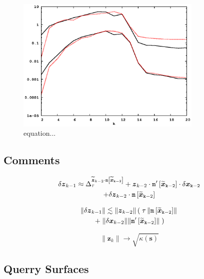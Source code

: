 \documentclass[letterpaper,twocolumn,amsmath,amsfont,amssymb,english,aps,jcp,preprintnumbers,groupaddress,nofootinbib,tightenlines]{revtex4}
\newcommand{\mat}[1]{\boldsymbol{#1}}
\begin{document}
\begin{figure}[h]
  \caption{equation...}
 \includegraphics[width=3.5in]{8x_33_nanotube_cond10_compare_errors.eps}
\end{figure}

\subsection{Comments}

\begin{multline}
 \delta {\mat{z}}_{k-1} \approx \Delta^{\widetilde{\mat{z}}_{k-2} \cdot \tt{m}\left[ \widetilde{\mat{x}}_{k-2}\right]}_\tau 
+ \mat{z}_{k-2} \cdot \tt{m}'\left[ \widetilde{\mat{x}}_{k-2}\right] \cdot \delta \mat{x}_{k-2} \\
+\delta \mat{z}_{k-2} \cdot \tt{m} \left[\widetilde{\mat{x}}_{k-2} \right] 
\end{multline}

\begin{multline}
\lVert \delta {\mat{z}}_{k-1} \rVert \lesssim
\lVert \mat{z}_{k-2} \rVert \left( \;  \tau \, \lVert \tt{m} \left[\widetilde{\mat{x}}_{k-2} \right]  \rVert \right.   \\ \left.
+ \; \lVert \delta {\mat{x}}_{k-2} \rVert   \lVert \tt{m}' \left[\widetilde{\mat{x}}_{k-2} \right] \rVert \; \right)
\end{multline}

\begin{equation}
\lVert \mat{z}_{k} \rVert  \rightarrow \sqrt{\kappa\left(\mat{s} \right)}
\end{equation}

\subsection{Querry Surfaces}
\end{document}
